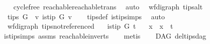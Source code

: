 \begin{isabellebody}
%
\isadelimproof
\ \ %
\endisadelimproof
%
\isatagproof
{}\isamarkupfalse%
\ cycle{\isacharunderscore}{\kern0pt}free\ reachable{}{\isacharunderscore}{\kern0pt}reachable{\isacharunderscore}{\kern0pt}trans\ \isamarkupfalse%
\ auto%
\endisatagproof
{\isafoldproof}%
%
\isadelimproof
%
\endisadelimproof
%
\isadelimdocument
%
\endisadelimdocument
%
\isatagdocument
%
\isamarkuptrue%
%
\endisatagdocument
{\isafolddocument}%
%
\isadelimdocument
%
\endisadelimdocument
{}\isamarkupfalse%
\ {\isacharparenleft}{\kern0pt}\ wf{\isacharunderscore}{\kern0pt}digraph{\isacharparenright}{\kern0pt}\ tips{\isacharunderscore}{\kern0pt}alt{\isacharcolon}{\kern0pt}\isanewline
\ \ {\isachardoublequoteopen}tips\ G\ {\isacharequal}{\kern0pt}\ {\isacharbraceleft}{\kern0pt}v{\isachardot}{\kern0pt}\ is{\isacharunderscore}{\kern0pt}tip\ G\ v{\isacharbraceright}{\kern0pt}{\isachardoublequoteclose}\isanewline
%
\isadelimproof
\ \ %
\endisadelimproof
%
\isatagproof
{}\isamarkupfalse%
\ tips{\isacharunderscore}{\kern0pt}def\ is{\isacharunderscore}{\kern0pt}tip{\isachardot}{\kern0pt}simps\ \isamarkupfalse%
\ auto%
\endisatagproof
{\isafoldproof}%
%
\isadelimproof
\isanewline
%
\endisadelimproof
\isanewline
{}\isamarkupfalse%
\ {\isacharparenleft}{\kern0pt}\ wf{\isacharunderscore}{\kern0pt}digraph{\isacharparenright}{\kern0pt}\ tips{\isacharunderscore}{\kern0pt}not{\isacharunderscore}{\kern0pt}referenced{\isacharcolon}{\kern0pt}\isanewline
\ \ \ {\isachardoublequoteopen}is{\isacharunderscore}{\kern0pt}tip\ G\ t{\isachardoublequoteclose}\isanewline
\ \ \ {\isachardoublequoteopen}{\isasymforall}x{\isachardot}{\kern0pt}\ {\isasymnot}\ x\ {\isasymrightarrow}\isactrlsup {\isacharplus}{\kern0pt}\ t{\isachardoublequoteclose}\isanewline
%
\isadelimproof
\ \ %
\endisadelimproof
%
\isatagproof
{}\isamarkupfalse%
\ is{\isacharunderscore}{\kern0pt}tip{\isachardot}{\kern0pt}simps\ assms\ reachable{}{\isacharunderscore}{\kern0pt}in{\isacharunderscore}{\kern0pt}verts{\isacharparenleft}{\kern0pt}{}{\isacharparenright}{\kern0pt}\isanewline
\ \ \isamarkupfalse%
\ metis%
\endisatagproof
{\isafoldproof}%
%
\isadelimproof
\ \isanewline
%
\endisadelimproof
\isanewline
{}\isamarkupfalse%
\ {\isacharparenleft}{\kern0pt}\ DAG{\isacharparenright}{\kern0pt}\ del{\isacharunderscore}{\kern0pt}tips{\isacharunderscore}{\kern0pt}dag{\isacharcolon}{\kern0pt}\isanewline

\end{isabellebody}
